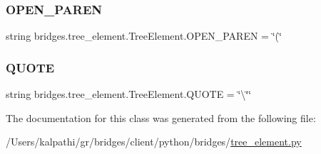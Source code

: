 \subsubsection{\texorpdfstring{O\+P\+E\+N\+\_\+\+P\+A\+R\+EN}{OPEN\_PAREN}}
{\footnotesize\ttfamily string bridges.\+tree\+\_\+element.\+Tree\+Element.\+O\+P\+E\+N\+\_\+\+P\+A\+R\+EN = \char`\"{}(\char`\"{}\hspace{0.3cm}{\ttfamily [static]}}

\mbox{\label{classbridges_1_1tree__element_1_1_tree_element_aa5a4d14f38ceb896a85ef0b703d6995a}} 
\subsubsection{\texorpdfstring{Q\+U\+O\+TE}{QUOTE}}
{\footnotesize\ttfamily string bridges.\+tree\+\_\+element.\+Tree\+Element.\+Q\+U\+O\+TE = \char`\"{}\textbackslash{}\char`\"{}\char`\"{}\hspace{0.3cm}{\ttfamily [static]}}



The documentation for this class was generated from the following file\+:\begin{DoxyCompactItemize}
\item 
/\+Users/kalpathi/gr/bridges/client/python/bridges/\mbox{\hyperlink{tree__element_8py}{tree\+\_\+element.\+py}}\end{DoxyCompactItemize}
